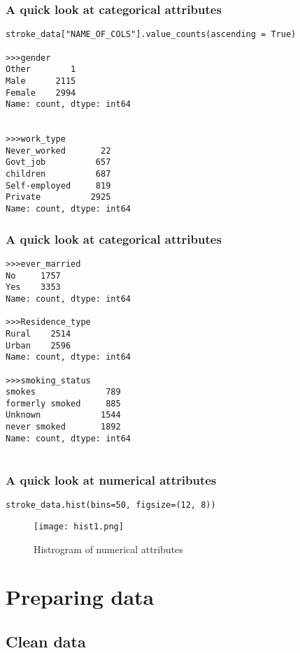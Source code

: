 \documentclass[10pt]{beamer}
\theoremstyle{definition}
\theoremstyle{remark}
\numberwithin{equation}{section}
\begin{document}
\begin{frame}[fragile]
	\frametitle{A quick look at categorical attributes}
\begin{lstlisting}
stroke_data["NAME_OF_COLS"].value_counts(ascending = True)

>>>gender
Other        1
Male      2115
Female    2994
Name: count, dtype: int64


>>>work_type
Never_worked       22
Govt_job          657
children          687
Self-employed     819
Private          2925
Name: count, dtype: int64
\end{lstlisting}
	
\end{frame}


\begin{frame}[fragile]
	\frametitle{A quick look at categorical attributes}
	\begin{lstlisting}
>>>ever_married
No     1757
Yes    3353
Name: count, dtype: int64
	
>>>Residence_type
Rural    2514
Urban    2596
Name: count, dtype: int64
	
>>>smoking_status
smokes              789
formerly smoked     885
Unknown            1544
never smoked       1892
Name: count, dtype: int64
	
	\end{lstlisting}
	
\end{frame}



\begin{frame}[fragile]
	\frametitle{A quick look at numerical attributes}
\begin{lstlisting}
stroke_data.hist(bins=50, figsize=(12, 8))	\end{lstlisting}
	
	\begin{figure}[h]
		\caption{Histrogram of numerical attributes }
		\centering
		\texttt{[image: hist1.png]}
	\end{figure}
	
\end{frame}




\section{Preparing data}
\subsection{Clean data}
\end{document}
